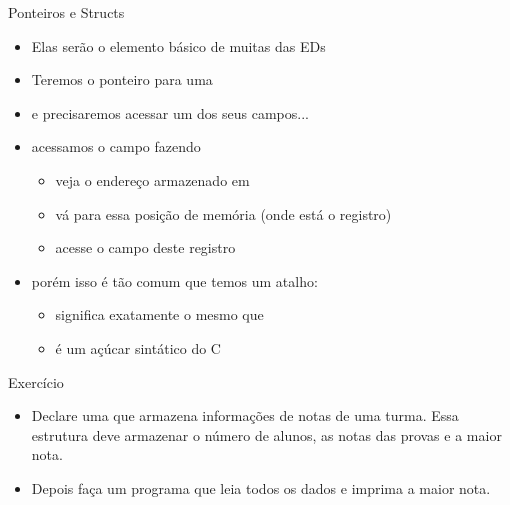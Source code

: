 \documentclass{beamer}
\begin{document}
\begin{frame}[<+->]{Ponteiros e Structs}
  \begin{itemize}
    \item Elas serão o elemento básico de muitas das EDs
    \item Teremos o ponteiro para uma 
    \item e precisaremos acessar um dos seus campos...
  \end{itemize}

  \bigskip
  \begin{itemize}
    \item acessamos o campo  fazendo 
      \begin{itemize}
        \item veja o endereço armazenado em 
        \item vá para essa posição de memória (onde está o registro)
        \item acesse o campo  deste registro
      \end{itemize}
    \item porém isso é tão comum que temos um atalho: 
      \begin{itemize}
        \item significa exatamente o mesmo que 
        \item é um açúcar sintático do C
      \end{itemize}
  \end{itemize}
\end{frame}

\begin{frame}[<+->]{Exercício}
  \begin{itemize}
    \item Declare uma  que armazena informações de notas de uma
      turma. Essa estrutura deve armazenar o número de alunos, as notas das
      provas e a maior nota.

    \item Depois faça um programa que leia todos os dados e imprima a maior nota.
  \end{itemize}
\end{frame}
\end{document}
